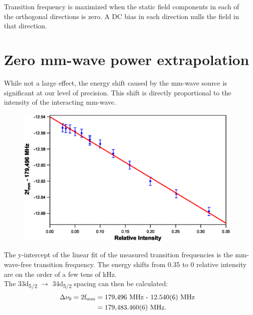 \documentclass[landscape]{sciposter}
\begin{document}
\begin{multicols}{4}
Transition frequency is maximized when the static field components in each of the orthogonal directions is zero. A DC bias in each direction nulls the field in that direction. 

\section*{\large Zero mm-wave power extrapolation}
While not a large effect, the energy shift caused by the mm-wave source is significant at our level of precision. This shift is directly proportional to the intensity of the interacting mm-wave. 

\begin{figure}
\begin{center}
\includegraphics[scale = 0.9]{psans52.eps}
\caption{}
\label{Power}
\end{center}
\end{figure}

The y-intercept of the linear fit of the measured transition frequencies is the mm-wave-free transition frequency. The energy shifts from 0.35 to 0 relative intensity are on the order of a few tens of kHz.\\

The 33d\textsubscript{5/2} $\rightarrow$ 34d\textsubscript{5/2} spacing can then be calculated:
\begin{align*}
\Delta \nu_0 = \textrm{2f\textsubscript{mm}} &= \textrm{179,496 MHz - 12.540(6) MHz} \\ &= \textrm{179,483.460(6) MHz}.
\end{align*}




\end{multicols}
\end{document}
